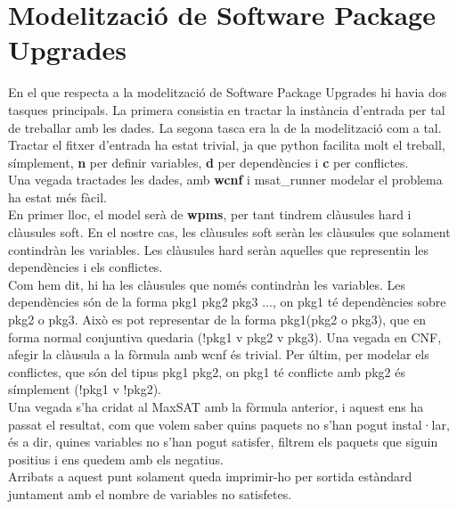 \documentclass{article}
\begin{document}
\section{Modelització de Software Package Upgrades}
En el que respecta a la modelització de Software Package Upgrades
hi havia dos tasques principals. La primera consistia en tractar
la instància d'entrada per tal de treballar amb les dades. La 
segona tasca era la de la modelització com a tal.\\
Tractar el fitxer d'entrada ha estat trivial, ja que python
facilita molt el treball, símplement, \textbf{n} per definir
variables, \textbf{d} per dependències i \textbf{c} per 
conflictes.\\
Una vegada tractades les dades, amb \textbf{wcnf} i msat\_runner
modelar el problema ha estat més fàcil.\\
 En primer lloc, el 
model serà de \textbf{wpms}, per tant tindrem clàusules hard i
clàusules soft. En el nostre cas, les clàusules soft seràn les
clàusules que solament contindràn les variables. Les clàusules
hard seràn aquelles que representin les dependències i els
conflictes.\\
Com hem dit, hi ha les clàusules que només
contindràn les variables. Les dependències són de la forma
pkg1 pkg2 pkg3 ..., on pkg1 té dependències sobre pkg2 o 
pkg3. Això es pot representar de la forma pkg1\textrightarrow(pkg2 o pkg3),
que en forma normal conjuntiva quedaria (!pkg1 v pkg2 v pkg3).
Una vegada en CNF, afegir la clàusula a la fòrmula amb wcnf és
trivial. Per últim, per modelar els conflictes, que són del tipus pkg1 pkg2,
on pkg1 té conflicte amb pkg2 és símplement (!pkg1 v !pkg2).\\
Una vegada s'ha cridat al MaxSAT amb la fòrmula anterior, i aquest
ens ha passat el resultat, com que volem saber quins paquets
no s'han pogut instal·lar, és a dir, quines variables no s'han
pogut satisfer, filtrem els paquets que siguin positius i ens
quedem amb els negatius.\\
Arribats a aquest punt solament queda imprimir-ho per sortida estàndard
juntament amb el nombre de variables no satisfetes.
\end{document}
